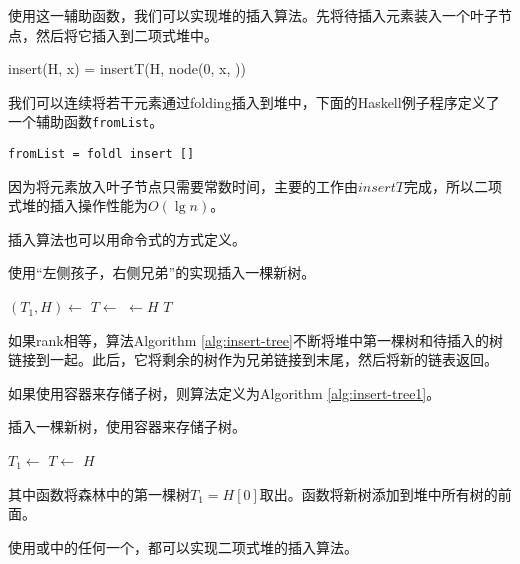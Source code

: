 \documentclass[UTF8]{article}
\begin{document}
使用这一辅助函数，我们可以实现堆的插入算法。先将待插入元素装入一个叶子节点，然后将它插入到二项式堆中。

\be
insert(H, x) = insertT(H, node(0, x, \phi))
\ee

我们可以连续将若干元素通过folding插入到堆中，下面的Haskell例子程序定义了一个辅助函数\texttt{fromList}。

\begin{lstlisting}
fromList = foldl insert []
\end{lstlisting}

因为将元素放入叶子节点只需要常数时间，主要的工作由$insertT$完成，所以二项式堆的插入操作性能为$O(\lg n)$。

插入算法也可以用命令式的方式定义。

\begin{algorithm}
\caption{使用“左侧孩子，右侧兄弟”的实现插入一棵新树。}
\label{alg:insert-tree}
\begin{algorithmic}[1]
    \State $(T_1, H) \gets$ 
    \State $T \gets $ 
  \EndWhile
  \State {} $\gets H$
  \State \Return $T$
\EndFunction
\end{algorithmic}
\end{algorithm}

如果rank相等，算法Algorithm \ref{alg:insert-tree}不断将堆中第一棵树和待插入的树链接到一起。此后，它将剩余的树作为兄弟链接到末尾，然后将新的链表返回。

如果使用容器来存储子树，则算法定义为Algorithm \ref{alg:insert-tree1}。

\begin{algorithm}
\caption{插入一棵新树，使用容器来存储子树。}
\label{alg:insert-tree1}
\begin{algorithmic}[1]
    \State $T_1 \gets$ 
    \State $T \gets $ 
  \EndWhile
  \State {}
  \State \Return $H$
\EndFunction
\end{algorithmic}
\end{algorithm}

其中函数将森林中的第一棵树$T_1 = H[0]$取出。函数将新树添加到堆中所有树的前面。

使用或中的任何一个，都可以实现二项式堆的插入算法。
\end{document}
